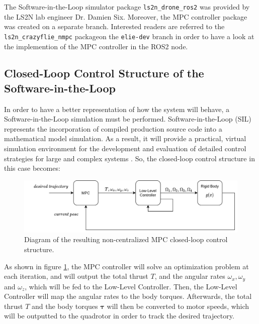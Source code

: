 \documentclass{thesisreport}
\begin{document}
The Software-in-the-Loop simulator package \texttt{ls2n\_drone\_ros2}\protect\footnotemark  
 was provided by the LS2N lab engineer Dr. Damien Six\protect\footnotemark. Moreover, the MPC controller package was created on a separate branch.
Interested readers are referred to the \texttt{ls2n\_crazyflie\_nmpc} package\protect\footnotemark on the \texttt{elie-dev} branch in order to have a look at the implemention of the MPC controller in the ROS2 node.	



	
	\subsection{Closed-Loop Control Structure of the Software-in-the-Loop}

In order to have a better representation of how the system will behave, a Software-in-the-Loop simulation must be performed. Software-in-the-Loop (SIL) represents the incorporation of compiled production source code into a mathematical model simulation. As a result, it will provide a practical, virtual simulation environment for the development and evaluation of detailed control strategies for large and complex systems \cite{SIL2021}. So, the closed-loop control structure in this case becomes:


\begin{figure}[h]
	\centering
	\includegraphics[width=\textwidth]{Images/diagrams/new_sim_diagram.png}
	\caption{Diagram of the resulting non-centralized MPC closed-loop control structure.}
	\label{fig:non_centralized_mpc_for_SIL}
\end{figure}

As shown in figure \ref{fig:non_centralized_mpc_for_SIL}, the MPC controller will solve an optimization problem at each iteration, and will output the total thrust $T$, and the angular rates $\omega_x, \omega_y$ and $\omega_z$, which will be fed to the Low-Level Controller. Then, the Low-Level Controller will map the angular rates to the body torques. Afterwards, the total thrust $T$ and the body torques $\bm{\tau}$ will then be converted to motor speeds, which will be outputted to the quadrotor in order to track the desired trajectory.
\end{document}
